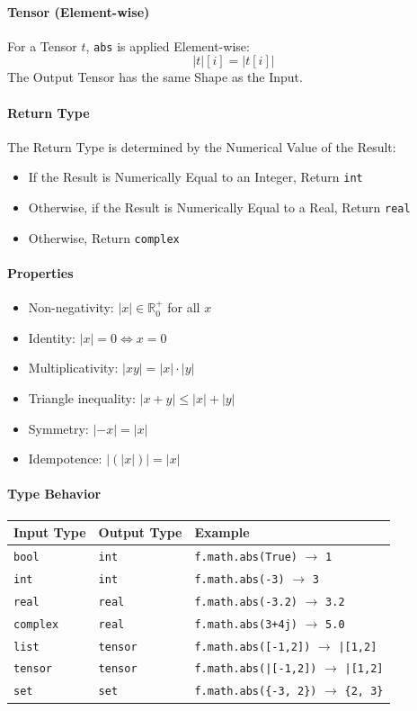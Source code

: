 \paragraph{Tensor (Element-wise)}
For a Tensor $t$, \texttt{abs} is applied Element-wise:
\[
|t|[i] = |t[i]|
\]
The Output Tensor has the same Shape as the Input.

\paragraph{Return Type}
The Return Type is determined by the Numerical Value of the Result:
\begin{itemize}
\item If the Result is Numerically Equal to an Integer, Return \texttt{int}
\item Otherwise, if the Result is Numerically Equal to a Real, Return \texttt{real}
\item Otherwise, Return \texttt{complex}
\end{itemize}

\paragraph{Properties}
\begin{itemize}
\item Non-negativity: $|x| \in \mathbb{R}^+_0$ for all $x$
\item Identity: $|x| = 0 \iff x = 0$
\item Multiplicativity: $|xy| = |x| \cdot |y|$
\item Triangle inequality: $|x + y| \leq |x| + |y|$
\item Symmetry: $|-x| = |x|$
\item Idempotence: $|(|x|)| = |x|$
\end{itemize}

\paragraph{Type Behavior}
\begin{center}
\begin{tabular}{lll}
\textbf{Input Type} & \textbf{Output Type} & \textbf{Example} \\ \hline
\texttt{bool} & \texttt{int} & \texttt{f.math.abs(True)} $\to$ \texttt{1} \\
\texttt{int} & \texttt{int} & \texttt{f.math.abs(-3)} $\to$ \texttt{3} \\
\texttt{real} & \texttt{real} & \texttt{f.math.abs(-3.2)} $\to$ \texttt{3.2} \\
\texttt{complex} & \texttt{real} & \texttt{f.math.abs(3+4j)} $\to$ \texttt{5.0} \\
\texttt{list} & \texttt{tensor} & \texttt{f.math.abs([-1,2])} $\to$ \texttt{|[1,2]} \\
\texttt{tensor} & \texttt{tensor} & \texttt{f.math.abs(|[-1,2])} $\to$ \texttt{|[1,2]} \\
\texttt{set} & \texttt{set} & \texttt{f.math.abs(\{-3, 2\})} $\to$ \texttt{\{2, 3\}} \\
\end{tabular}
\end{center}

